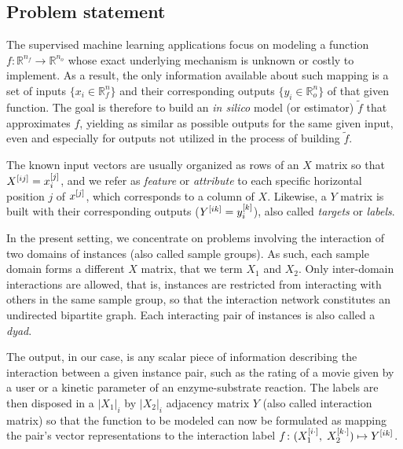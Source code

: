 \subsection{Problem statement}
\label{sec:problem_statement}

The supervised machine learning applications focus on modeling a function $f
\colon \mathbb{R}^{n_f} \to \mathbb{R}^{n_o}$ whose exact underlying mechanism
is unknown or costly to implement. As a result, the only information available
about such mapping is a set of inputs $\{x_i \in \mathbb R^n_f\}$ and their
corresponding outputs $\{y_i \in \mathbb R^n_o\}$ of that given function. The
goal is therefore to build an \textit{in silico} model (or estimator) $\tilde f$
that approximates $f$, yielding as similar as possible outputs for the same
given input, even and especially for outputs not utilized in the process of
building $\tilde f$.


The known input vectors are usually organized as rows of an $X$ matrix so that
$X^{[ij]} = x_i^{[j]}$, and we refer as \emph{feature} or \emph{attribute} to
each specific horizontal position $j$ of $x^{[j]}$, which corresponds to a column
of $X$. Likewise, a $Y$ matrix is built with their corresponding outputs
($Y^{[ik]} = y_i^{[k]}$), also called \emph{targets} or \emph{labels}.


In the present setting, we concentrate on problems involving the interaction of
two domains of instances (also called sample groups). As such, each sample
domain forms a different $X$ matrix, that we term $X_1$ and $X_2$. Only
inter-domain interactions are allowed, that is, instances are restricted from
interacting with others in the same sample group, so that the interaction
network constitutes an undirected bipartite graph.
%
Each interacting pair of instances is also called a \emph{dyad}.

The output, in our case, is any scalar piece of information describing the
interaction between a given instance pair, such as the rating of a movie given
by a user or a kinetic parameter of an enzyme-substrate reaction.
The labels are
then disposed in a $|X_1|_i$ by $|X_2|_i$ adjacency matrix $Y$ (also called
interaction matrix) so that the function to be modeled can now be formulated as
mapping the pair's vector representations to the interaction label $f\colon
(X_1^{[i\cdot]},\; X_2^{[k\cdot]}) \mapsto Y^{[ik]}$.

